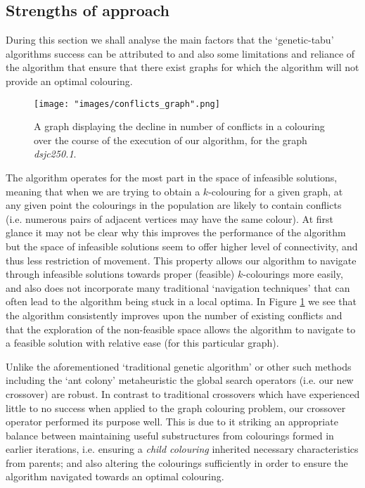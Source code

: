 \documentclass[12pt,a4paper]{article}
\begin{document}
\subsection*{Strengths of approach}
\par During this section we shall analyse the main factors that the `genetic-tabu' algorithms success can be attributed to and also some limitations and reliance of the algorithm that ensure that there exist graphs for which the algorithm will not provide an optimal colouring.
 \begin{figure}[h]
\centering
\texttt{[image: "images/conflicts\_graph".png]}
\caption{A graph displaying the decline in number of conflicts in a colouring over the course of the execution of our algorithm, for the graph \textit{dsjc250.1}.}
\vspace*{-0.25cm}
\label{fig:conflicts}
\end{figure}
\par The algorithm operates for the most part in the space of infeasible solutions, meaning that when we are trying to obtain a $k$-colouring for a given graph, at any given point the colourings in the population are likely to contain conflicts (i.e. numerous pairs of adjacent vertices may have the same colour). At first glance it may not be clear why this improves the performance of the algorithm but the space of infeasible solutions seem to offer higher level of connectivity, and thus less restriction of movement. This property allows our algorithm to navigate through infeasible solutions towards proper (feasible) $k$-colourings more easily, and also does not incorporate many traditional `navigation techniques' that can often lead to the algorithm being stuck in a local optima. In Figure \ref{fig:conflicts} we see that the algorithm consistently improves upon the number of existing conflicts and that the exploration of the non-feasible space allows the algorithm to navigate to a feasible solution with relative ease (for this particular graph).

\par Unlike the aforementioned `traditional genetic algorithm' or other such methods including the `ant colony' metaheuristic the global search operators (i.e. our new crossover) are robust. In contrast to traditional crossovers which have experienced little to no success when applied to the graph colouring problem, our crossover operator performed its purpose well. This is due to it striking an appropriate balance between maintaining useful substructures from colourings formed in earlier iterations, i.e. ensuring a \textit{child colouring} inherited necessary characteristics from parents; and also altering the colourings sufficiently in order to ensure the algorithm navigated towards an optimal colouring.
\end{document}
